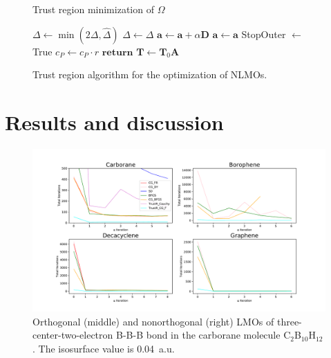 \documentclass[aps,prl,reprint,amsmath,amssymb]{revtex4-1}
\begin{document}
\begin{figure}
\addtocounter{algorithm}{-1}
\begin{algorithm}[H]
\caption{Trust region minimization of $\Omega$}
   \begin{algorithmic}[1]
                       \State $\Delta \gets \min{(2\Delta, \hat{\Delta})}$
                     \Else
                        \State $\Delta \gets \Delta$ 
                     \EndIf
                 \EndIf
                 \If{$\rho > \eta$}
                    \State $\mathbf{a}\gets \mathbf{a} + \alpha \mathbf{D}$ 
                  \Else
                     \State $\mathbf{a}\gets  \mathbf{a}$ 
                 \EndIf
			\EndIf
			\State StopOuter $\gets$ True
		\EndIf
			\State $c_{P} \gets c_P \cdot r$ 
		\EndIf
	\State $\mathbf{return}$ $\mathbf{T} \gets \mathbf{T}_0 \mathbf{A} $ 
   \end{algorithmic}
\end{algorithm}
\caption{\label{fig:cg} Trust region algorithm for the optimization of NLMOs.}
\end{figure}


\section{Results and discussion}

\begin{figure}[htb]
\centering
\includegraphics[width=\textwidth]{occupied_iter.pdf}
\caption{Orthogonal (middle) and nonorthogonal (right) LMOs of three-center-two-electron B-B-B bond in the carborane molecule C$_2$B$_{10}$H$_{12}$. The isosurface value is 0.04~a.u.}
\label{fig:boro}
\end{figure}
\end{document}
